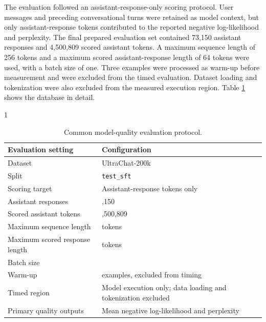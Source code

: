 The evaluation followed an assistant-response-only scoring protocol.
User messages and preceding conversational turns were retained as model
context, but only assistant-response tokens contributed to the reported
negative log-likelihood and perplexity. The final prepared evaluation
set contained 73,150 assistant responses and 4,500,809 scored assistant
tokens. A maximum sequence length of 256 tokens and a maximum scored
assistant-response length of 64 tokens were used, with a batch size of
one. Three examples were processed as warm-up before measurement and
were excluded from the timed evaluation. Dataset loading and
tokenization were also excluded from the measured execution region. Table \ref{tab:common-evaluation-protocol} shows the database in detail.
\begin{table}[htbp]
\centering
\caption{Common model-quality evaluation protocol.}
\label{tab:common-evaluation-protocol}

\begin{spacing}{1}
\small
\renewcommand{\arraystretch}{1.20}

\begin{tabularx}{\textwidth}{
@{}
>{\raggedright\arraybackslash}p{}
>{\raggedright\arraybackslash}X
@{}
}
\toprule
\textbf{Evaluation setting} &
\textbf{Configuration} \\
\midrule

Dataset &
UltraChat-200k \\

Split &
\texttt{test\_sft} \\

Scoring target &
Assistant-response tokens only \\

Assistant responses &
73,150 \\

Scored assistant tokens &
4,500,809 \\

Maximum sequence length &
256 tokens \\

Maximum scored response length &
64 tokens \\

Batch size &
1 \\

Warm-up &
3 examples, excluded from timing \\

Timed region &
Model execution only; data loading and tokenization excluded \\

Primary quality outputs &
Mean negative log-likelihood and perplexity \\

\bottomrule
\end{tabularx}
\end{spacing}
\end{table}


